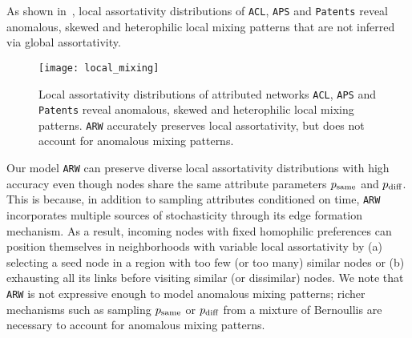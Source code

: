 As shown in~, local assortativity distributions
of \texttt{ACL}, \texttt{APS} and \texttt{Patents} reveal anomalous, skewed
and heterophilic local mixing patterns that are not inferred via global assortativity.
\begin{figure}[h]
	\centering
	\texttt{[image: local\_mixing]}
	\caption{Local assortativity distributions of attributed networks \texttt{ACL}, \texttt{APS}
		and \texttt{Patents} reveal anomalous, skewed and heterophilic local mixing patterns.
		\texttt{ARW} accurately preserves local assortativity, but does not account for anomalous mixing patterns.}
	\label{fig:local_atty}
	\vspace{-8pt}
\end{figure}
Our model \texttt{ARW} can preserve
diverse local assortativity distributions with high accuracy even though nodes
share the same attribute parameters $p_{\scriptsize\mbox{same}}$ and $p_{\scriptsize\mbox{diff}}$. This is because, in addition
to sampling attributes conditioned on time, \texttt{ARW}
incorporates multiple sources of stochasticity through its edge formation
mechanism. As a result, incoming nodes with fixed homophilic preferences can position
themselves in neighborhoods with variable local assortativity by (a) selecting a seed node in a region
with too few (or too many) similar nodes or (b) exhausting all its links before
visiting similar (or dissimilar) nodes.
We note that \texttt{ARW} is not expressive enough to model anomalous
mixing patterns; richer mechanisms such as sampling $p_{\scriptsize\mbox{same}}$ or $p_{\scriptsize\mbox{diff}}$
from a mixture of Bernoullis are necessary to account for anomalous mixing patterns.
